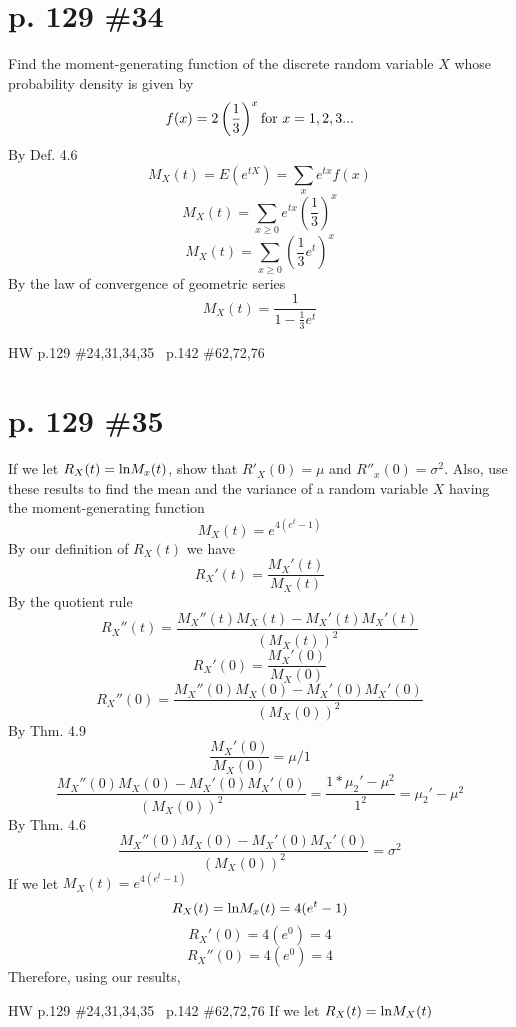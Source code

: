 \documentclass[12pt]{article}
\begin{document}
\section[20pt]{p. 129 \#34}
Find the moment-generating function of the discrete random variable \(X\) whose probability density is given by
\[f(x)=2\left(\frac{1}{3}\right)^x \textup{for }x = 1,2,3...\]
By Def. 4.6
\[M_X(t)=E(e^{tX})=\sum_{x}e^{tx}f(x)\]
\[M_X(t)=\sum_{x\geq0}e^{tx}\left(\frac{1}{3}\right)^x\]
\[M_X(t)=\sum_{x\geq0}\left(\frac{1}{3}e^t\right)^x\]
By the law of convergence of geometric series
\[M_X(t)=\frac{1}{1-\frac{1}{3}e^t}\]
\newpage
\maketitle HW p.129 \#24,31,34,35 \ p.142 \#62,72,76

\section[20pt]{p. 129 \#35}
If we let \(R_X(t)=\textup{ln}M_x(t)\), show that \(R'_X(0)=\mu\) and \(R''_x(0)=\sigma^2\). Also, use these results to find the mean and the variance of a random variable \(X\) having the moment-generating function
\[M_X(t) = e^{4(e^t-1)}\] \newline
By our definition of \(R_X(t)\) we have
\[R_X'(t)=\frac{M_X'(t)}{M_X(t)}\]
By the quotient rule
\[R_X''(t)=\frac{M_X''(t)M_X(t)-M_X'(t)M_X'(t)}{(M_X(t))^2}\]
\[R_X'(0)=\frac{M_X'(0)}{M_X(0)}\]
\[R_X''(0)=\frac{M_X''(0)M_X(0)-M_X'(0)M_X'(0)}{(M_X(0))^2}\]
By Thm. 4.9
\[\frac{M_X'(0)}{M_X(0)}=\mu/1\]
\[\frac{M_X''(0)M_X(0)-M_X'(0)M_X'(0)}{(M_X(0))^2}=\frac{1*\mu_2'-\mu^2}{1^2}=\mu_2'-\mu^2\]
By Thm. 4.6
\[\frac{M_X''(0)M_X(0)-M_X'(0)M_X'(0)}{(M_X(0))^2}=\sigma^2\]
\newline
If we let \(M_X(t) = e^{4(e^t-1)}\)
\[R_X(t)=\textup{ln}M_x(t)=4(e^t-1)\]
\[R_X'(0)=4(e^0)=4\]
\[R_X''(0)=4(e^0)=4\]
Therefore, using our results,

\newpage
\maketitle HW p.129 \#24,31,34,35 \ p.142 \#62,72,76
If we let \(R_X(t)=\textup{ln}M_X(t)\)
\end{document}
